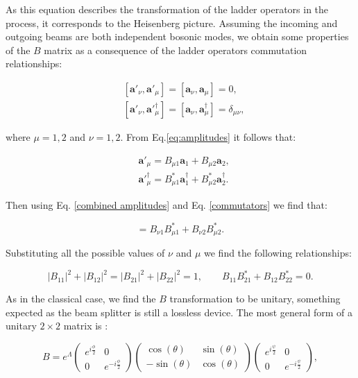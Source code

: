 \documentclass{book}
\begin{document}
{As this equation describes the transformation of the ladder operators in the process, it corresponds to the Heisenberg picture. Assuming the incoming and outgoing beams are both independent bosonic modes, we obtain some properties of the $B$ matrix as a consequence of the ladder operators commutation relationships:

\begin{align}
&[\mathbf{a}'_{\nu},\mathbf{a}'_{\mu}]=[\mathbf{a}_{\nu},\mathbf{a}_{\mu}]=0,\\
&[\mathbf{a}'_{\nu},\mathbf{a}'^{\dagger}_{\mu}]=[\mathbf{a}_{\nu},\mathbf{a}^{\dagger}_{\mu}]=\delta_{\mu \nu},
\label{commutators}
\end{align}

where $\mu=1,2$ and $\nu=1,2$. From Eq.\ref{eq:amplitudes} it follows that:

\begin{align}
&\mathbf{a}'_{\mu}=B_{\mu 1}\mathbf{a}_{1}+B_{\mu 2} \mathbf{a}_{2}, \\
&\mathbf{a}'^{\dagger}_{\mu}=B_{\mu 1}^{*}\mathbf{a}^{\dagger}_{1}+B_{\mu 2}^{*} \mathbf{a}^{\dagger}_{2}.
\label{combined amplitudes}
\end{align}

Then using Eq. \ref{combined amplitudes} and Eq. \ref{commutators} we find that:

\begin{equation}
   [\mathbf{a}'_{\nu},\mathbf{a}'^{\dagger}_{\mu}]=B_{\nu 1} B_{\mu 1}^{*}+B_{\nu 2} B_{\mu 2}^{*} .
\end{equation}

Substituting all the possible values of $\nu$ and $\mu$ we find the following relationships:

\begin{equation}
|B_{11}|^{2}+|B_{12}|^{2}=|B_{21}|^{2}+|B_{22}|^{2}=1 ,\qquad B_{11} B_{21}^{*}+B_{12} B_{22}^{*}=0.
\end{equation}

As in the classical case, we find the $B$ transformation to be unitary, something expected as the beam splitter is still a lossless device. The most general form of a unitary $2\times2$ matrix is \cite{leonhardt}:


\begin{equation}
B=e^{\Lambda} \begin{pmatrix} e^{i\frac{\phi}{2}} & 0 \\ 0 & e^{-i\frac{\phi}{2}} \end{pmatrix} \begin{pmatrix} \cos(\theta) &  \sin(\theta) \\ - \sin(\theta) & \cos(\theta) \end{pmatrix} \begin{pmatrix} e^{i\frac{\psi}{2}} & 0 \\ 0 & e^{-i\frac{\psi}{2}} \end{pmatrix} \label{unitary},
\end{equation}

}
\end{document}
